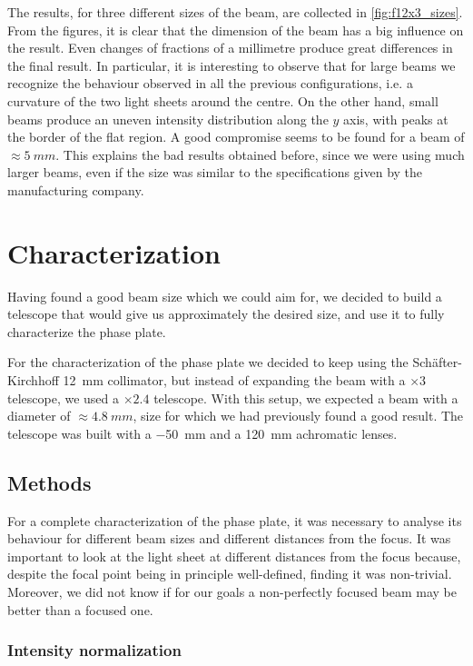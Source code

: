 The results, for three different sizes of the beam, are collected in \cref{fig:f12x3_sizes}. From the figures, it is clear that the dimension of the beam has a big influence on the result. Even changes of fractions of a millimetre produce great differences in the final result. In particular, it is interesting to observe that for large beams we recognize the behaviour observed in all the previous configurations, i.e. a curvature of the two light sheets around the centre. On the other hand, small beams produce an uneven intensity distribution along the $y$ axis, with peaks at the border of the flat region. A good compromise seems to be found for a beam of $\approx \SI{5}{mm}$. This explains the bad results obtained before, since we were using much larger beams, even if the size was similar to the specifications given by the manufacturing company.

\section{Characterization}
\label{sec:characterization}
Having found a good beam size which we could aim for, we decided to build a telescope that would give us approximately the desired size, and use it to fully characterize the phase plate.

For the characterization of the phase plate we decided to keep using the Schäfter-Kirchhoff \SI{12}{mm} collimator, but instead of expanding the beam with a $\times3$ telescope, we used a $\times2.4$ telescope. With this setup, we expected a beam with a diameter of $\approx \SI{4.8}{mm}$, size for which we had previously found a good result. The telescope was built with a \SI{-50}{mm} and a \SI{120}{mm} achromatic lenses.

\subsection{Methods}
\label{sec:characterization_methods}
For a complete characterization of the phase plate, it was necessary to analyse its behaviour for different beam sizes and different distances from the focus. It was important to look at the light sheet at different distances from the focus because, despite the focal point being in principle well-defined, finding it was non-trivial. Moreover, we did not know if for our goals a non-perfectly focused beam may be better than a focused one.

\subsubsection{Intensity normalization}

